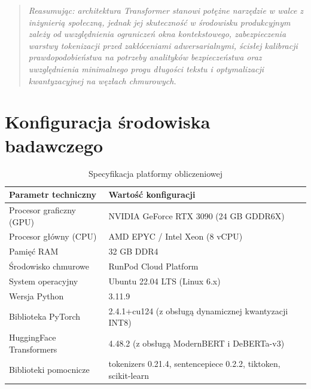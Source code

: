 \documentclass[12pt,a4paper,twoside]{report}
\begin{document}
\begin{enumerate}[leftmargin=*]
\end{enumerate}

\begin{quotation}
\textit{Reasumując: architektura Transformer stanowi potężne narzędzie w walce z inżynierią społeczną, jednak jej skuteczność w środowisku produkcyjnym zależy od uwzględnienia ograniczeń okna kontekstowego, zabezpieczenia warstwy tokenizacji przed zakłóceniami adwersarialnymi, ścisłej kalibracji prawdopodobieństwa na potrzeby analityków bezpieczeństwa oraz uwzględnienia minimalnego progu długości tekstu i optymalizacji kwantyzacyjnej na węzłach chmurowych.}
\end{quotation}

\appendix
\chapter{Konfiguracja środowiska badawczego}\label{app:setup}
\begin{table}[H]\centering
\caption{Specyfikacja platformy obliczeniowej}\label{tab:app_env}
\begin{tabularx}{\textwidth}{l X}\toprule
\textbf{Parametr techniczny} & \textbf{Wartość konfiguracji} \\\midrule
Procesor graficzny (GPU) & NVIDIA GeForce RTX 3090 (24 GB GDDR6X) \\
Procesor główny (CPU) & AMD EPYC / Intel Xeon (8 vCPU) \\
Pamięć RAM & 32 GB DDR4 \\
Środowisko chmurowe & RunPod Cloud Platform \\
System operacyjny & Ubuntu 22.04 LTS (Linux 6.x) \\
Wersja Python & 3.11.9 \\
Biblioteka PyTorch & 2.4.1+cu124 (z obsługą dynamicznej kwantyzacji INT8) \\
HuggingFace Transformers & 4.48.2 (z obsługą ModernBERT i DeBERTa-v3) \\
Biblioteki pomocnicze & tokenizers 0.21.4, sentencepiece 0.2.2, tiktoken, scikit-learn \\
\bottomrule\end{tabularx}
\end{table}
\end{document}
